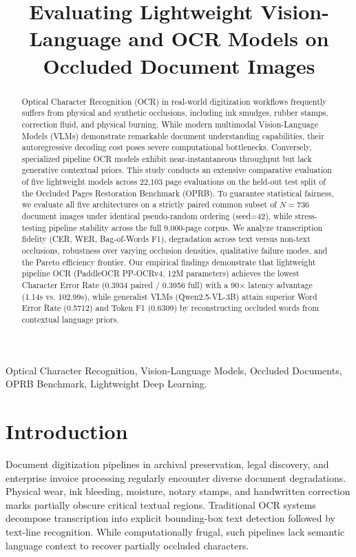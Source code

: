 \documentclass[conference,10pt,a4paper]{IEEEtran}
\title{Evaluating Lightweight Vision-Language and OCR Models on Occluded Document Images}
\author{\IEEEauthorblockN{Ho-Nam Nguyen}
\IEEEauthorblockA{\textit{University of Science, Vietnam National University - Ho Chi Minh City} \\
Course: CSC15006 --- Introduction to Natural Language Processing}
}
\begin{document}
\maketitle

\begin{abstract}
Optical Character Recognition (OCR) in real-world digitization workflows frequently suffers from physical and synthetic occlusions, including ink smudges, rubber stamps, correction fluid, and physical burning. While modern multimodal Vision-Language Models (VLMs) demonstrate remarkable document understanding capabilities, their autoregressive decoding cost poses severe computational bottlenecks. Conversely, specialized pipeline OCR models exhibit near-instantaneous throughput but lack generative contextual priors. This study conducts an extensive comparative evaluation of five lightweight models across 22,103 page evaluations on the held-out test split of the Occluded Pages Restoration Benchmark (OPRB). To guarantee statistical fairness, we evaluate all five architectures on a strictly paired common subset of $N=736$ document images under identical pseudo-random ordering (seed=42), while stress-testing pipeline stability across the full 9,000-page corpus. We analyze transcription fidelity (CER, WER, Bag-of-Words F1), degradation across text versus non-text occlusions, robustness over varying occlusion densities, qualitative failure modes, and the Pareto efficiency frontier. Our empirical findings demonstrate that lightweight pipeline OCR (PaddleOCR PP-OCRv4, 12M parameters) achieves the lowest Character Error Rate (0.3934 paired / 0.3956 full) with a 90$\times$ latency advantage (1.14s vs. 102.99s), while generalist VLMs (Qwen2.5-VL-3B) attain superior Word Error Rate (0.5712) and Token F1 (0.6309) by reconstructing occluded words from contextual language priors.
\end{abstract}

\begin{IEEEkeywords}
Optical Character Recognition, Vision-Language Models, Occluded Documents, OPRB Benchmark, Lightweight Deep Learning.
\end{IEEEkeywords}

\section{Introduction}
Document digitization pipelines in archival preservation, legal discovery, and enterprise invoice processing regularly encounter diverse document degradations. Physical wear, ink bleeding, moisture, notary stamps, and handwritten correction marks partially obscure critical textual regions. Traditional OCR systems decompose transcription into explicit bounding-box text detection followed by text-line recognition. While computationally frugal, such pipelines lack semantic language context to recover partially occluded characters.
\end{document}
